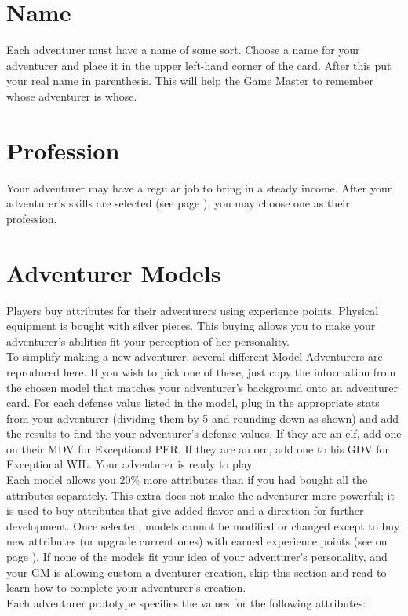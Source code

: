 \begin{multicols*}{2}
\section{Name}
Each adventurer must have a name of some sort. Choose a name for your adventurer and place it in the upper left-hand corner of the card. After this put your real name in parenthesis. This will help the Game Master to remember whose adventurer is whose.
\section{Profession}
Your adventurer may have a regular job to bring in a steady income. After your adventurer’s skills are selected (see page \textbf{\pageref{create-skills}}), you may choose one as their profession.
\section{Adventurer Models}
Players buy attributes for their adventurers using experience points. Physical equipment is bought with silver pieces. This buying allows you to make your adventurer’s abilities fit your perception of her personality.\\
To simplify making a new adventurer, several different Model Adventurers are reproduced here. If you wish to pick one of these, just copy the information from the chosen model that matches your adventurer’s background onto an adventurer card. For each defense value listed in the model, plug in the appropriate stats from your adventurer (dividing them by 5 and rounding down as shown) and add the results to find the your adventurer’s defense values. If they are an elf, add one on their MDV for Exceptional PER. If they are an orc, add one to his GDV for Exceptional WIL. Your adventurer is ready to play.\\
Each model allows you 20\% more attributes than if you had bought all the attributes separately. This extra does not make the adventurer more powerful; it is used to buy attributes that give added flavor and a direction for further development. Once selected, models cannot be modified or changed except to buy new attributes (or upgrade current ones) with earned experience points (see  on page \textbf{\pageref{create-buying}}).
If none of the models fit your idea of your adventurer’s personality, and your GM is allowing custom a dventurer creation, skip this section and read  to learn how to complete your adventurer’s creation.\\
Each adventurer prototype specifies the values for the following attributes:


\end{multicols*}
